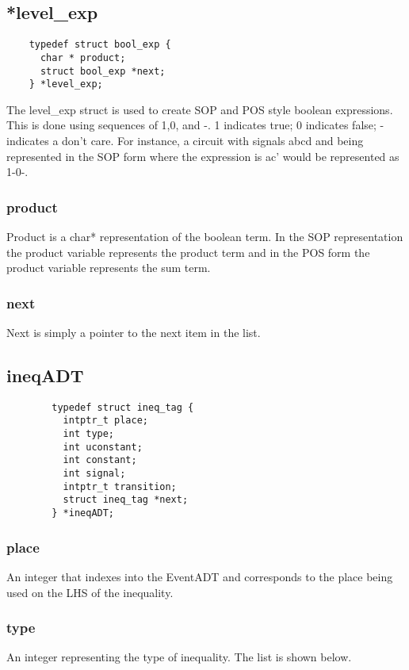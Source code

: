 \documentclass[titlepage,11pt]{article}
\begin{document}
  \subsection{*level\_exp}
  \begin{verbatim}
    typedef struct bool_exp {
      char * product;
      struct bool_exp *next;
    } *level_exp;
  \end{verbatim}

  The level\_exp struct is used to create SOP and POS style boolean
  expressions.  This is done using sequences of 1,0, and -.  1
  indicates true; 0 indicates false; - indicates a don't care.  For
  instance, a circuit with signals abcd and being represented in
  the SOP form where the expression is ac' would be represented as
  1-0-.  
  
  \subsubsection{product}
  Product is a char* representation of the boolean term.  In the SOP
  representation the product variable represents the product term and
  in the POS form the product variable represents the sum term.
  
  \subsubsection{next}
  Next is simply a pointer to the next item in the list.

	\subsection{ineqADT}
	\begin{verbatim}
		typedef struct ineq_tag {
		  intptr_t place;
		  int type;
		  int uconstant;
		  int constant;
		  int signal;
		  intptr_t transition;
		  struct ineq_tag *next;
		} *ineqADT;
	\end{verbatim}
	
	\subsubsection{place}
	An integer that indexes into the EventADT and corresponds to the place being used on the LHS of the inequality.
	
	\subsubsection{type}
	An integer representing the type of inequality.  The list is shown below.
	
\end{document}
